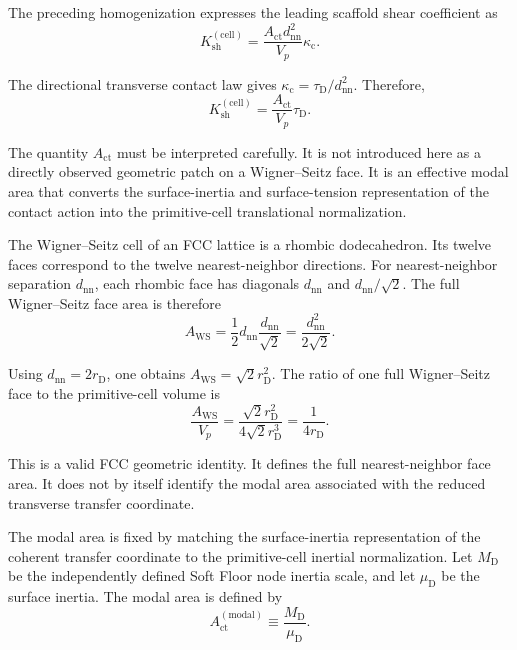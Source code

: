 The preceding homogenization expresses the leading scaffold shear coefficient as
\begin{equation}
    K_{\mathrm{sh}}^{(\mathrm{cell})} = \frac{A_{\mathrm{ct}}d_{\mathrm{nn}}^2}{V_p} \kappa_{\mathrm{c}}.
\end{equation}

The directional transverse contact law gives $\kappa_{\mathrm{c}} = \tau_{\mathrm{D}} / d_{\mathrm{nn}}^2$. Therefore,
\begin{equation}
    K_{\mathrm{sh}}^{(\mathrm{cell})} = \frac{A_{\mathrm{ct}}}{V_p} \tau_{\mathrm{D}}.
\end{equation}

The quantity $A_{\mathrm{ct}}$ must be interpreted carefully. It is not introduced here as a directly observed geometric patch on a Wigner–Seitz face. It is an effective modal area that converts the surface-inertia and surface-tension representation of the contact action into the primitive-cell translational normalization.

The Wigner–Seitz cell of an FCC lattice is a rhombic dodecahedron. Its twelve faces correspond to the twelve nearest-neighbor directions. For nearest-neighbor separation $d_{\mathrm{nn}}$, each rhombic face has diagonals $d_{\mathrm{nn}}$ and $d_{\mathrm{nn}} / \sqrt{2}$. The full Wigner–Seitz face area is therefore
\begin{equation}
    A_{\mathrm{WS}} = \frac{1}{2} d_{\mathrm{nn}} \frac{d_{\mathrm{nn}}}{\sqrt{2}} = \frac{d_{\mathrm{nn}}^2}{2\sqrt{2}}.
\end{equation}

Using $d_{\mathrm{nn}}=2r_{\mathrm{D}}$, one obtains $A_{\mathrm{WS}} = \sqrt{2}r_{\mathrm{D}}^2$. The ratio of one full Wigner–Seitz face to the primitive-cell volume is
\begin{equation}
    \frac{A_{\mathrm{WS}}}{V_p} = \frac{\sqrt{2}r_{\mathrm{D}}^2}{4\sqrt{2}r_{\mathrm{D}}^3} = \frac{1}{4r_{\mathrm{D}}}.
\end{equation}

This is a valid FCC geometric identity. It defines the full nearest-neighbor face area. It does not by itself identify the modal area associated with the reduced transverse transfer coordinate.

The modal area is fixed by matching the surface-inertia representation of the coherent transfer coordinate to the primitive-cell inertial normalization. Let $M_{\mathrm{D}}$ be the independently defined Soft Floor node inertia scale, and let $\mu_{\mathrm{D}}$ be the surface inertia. The modal area is defined by
\begin{equation}
    \boxed{ A_{\mathrm{ct}}^{(\mathrm{modal})} \equiv \frac{M_{\mathrm{D}}}{\mu_{\mathrm{D}}} }.
\end{equation}

